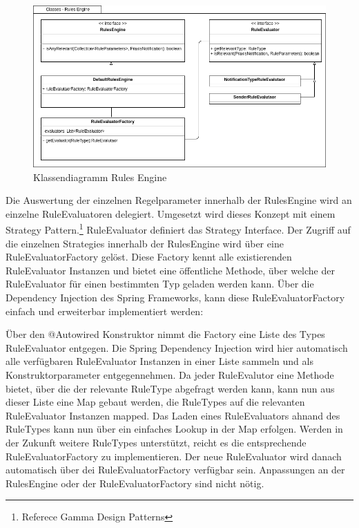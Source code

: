 \begin{figure}[h]
    \centering
    \begin{minipage}[b]{0.9\textwidth}
        \includegraphics[width=\textwidth]{graphics/Class_Configuration_RulesEngine}
        \caption{Klassendiagramm Rules Engine}
    \end{minipage}
\end{figure}

Die Auswertung der einzelnen Regelparameter innerhalb der RulesEngine wird an einzelne RuleEvaluatoren delegiert.
Umgesetzt wird dieses Konzept mit einem Strategy Pattern.\footnote{Referece Gamma Design Patterns}
RuleEvaluator definiert das Strategy Interface.
Der Zugriff auf die einzelnen Strategies innerhalb der RulesEngine wird über eine RuleEvaluatorFactory gelöst.
Diese Factory kennt alle existierenden RuleEvaluator Instanzen und bietet eine öffentliche Methode, über welche der RuleEvaluator für einen bestimmten Typ geladen werden kann.
Über die Dependency Injection des Spring Frameworks, kann diese RuleEvaluatorFactory einfach und erweiterbar implementiert werden:



Über den @Autowired Konstruktor nimmt die Factory eine Liste des Types RuleEvaluator entgegen.
Die Spring Dependency Injection wird hier automatisch alle verfügbaren RuleEvaluator Instanzen in einer Liste sammeln und als Konstruktorparameter entgegennehmen.
Da jeder RuleEvalutor eine Methode bietet, über die der relevante RuleType abgefragt werden kann, kann nun aus dieser Liste eine Map gebaut werden, die RuleTypes auf die relevanten RuleEvaluator Instanzen mapped.
Das Laden eines RuleEvaluators ahnand des RuleTypes kann nun über ein einfaches Lookup in der Map erfolgen.
Werden in der Zukunft weitere RuleTypes unterstützt, reicht es die entsprechende RuleEvaluatorFactory zu implementieren.
Der neue RuleEvaluator wird danach automatisch über dei RuleEvaluatorFactory verfügbar sein.
Anpassungen an der RulesEngine oder der RuleEvaluatorFactory sind nicht nötig.


